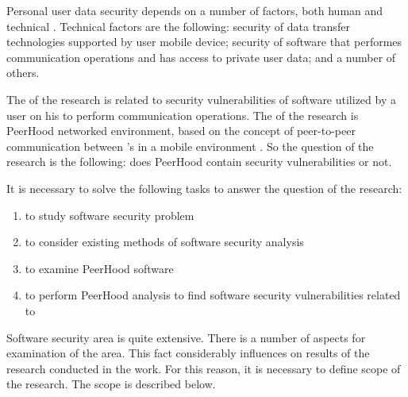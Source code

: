 %
Personal user data security depends on a number of factors, both human and technical . 
%
Technical factors are the following: security of data transfer technologies supported by user mobile device; security of software that performes communication operations and has access to private user data; and a number of others. 

%
The  of the research is related to security vulnerabilities of software utilized by a user on his  to perform communication operations. 
%
The  of the research is \The PeerHood networked environment, based on the concept of peer-to-peer communication between 's in a mobile environment . 
%
So the question of the research is the following: does PeerHood contain security vulnerabilities or not. 

%
It is necessary to solve the following tasks to answer the question of the research: 
\begin{enumerate}
	\item to study \The software security problem
	\item to consider existing methods of software security analysis
	\item to examine \The PeerHood software
	\item to perform PeerHood analysis to find software security vulnerabilities related to 
\end{enumerate}

%
Software security area is quite extensive. 
%
There is a number of aspects for examination of the area. 
%
This fact considerably influences on \The results of the research conducted in the work. 
%
For this reason, it is necessary to define \The scope of the research. 
%
The scope is described below. 
